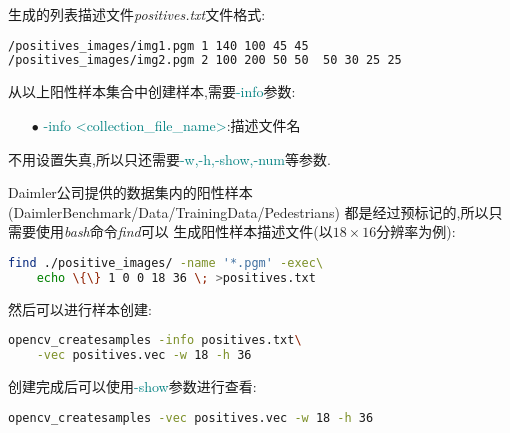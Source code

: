 \documentclass[10pt,technote]{IEEEtran}
\begin{document}
生成的列表描述文件\textit{positives.txt}文件格式:
\begin{lstlisting}[language=bash]
/positives_images/img1.pgm 1 140 100 45 45
/positives_images/img2.pgm 2 100 200 50 50  50 30 25 25
\end{lstlisting}
从以上阳性样本集合中创建样本,需要\textcolor{teal}{-info}参数:
\begin{enumerate}
\item[$\bullet$]\textcolor{teal}{-info <collection\_file\_name>}:描述文件名
\end{enumerate}
不用设置失真,所以只还需要\textcolor{teal}{-w,-h,-show,-num}等参数.

Daimler公司提供的数据集内的阳性样本
(\textsf{DaimlerBenchmark/Data/TrainingData/Pedestrians})
都是经过预标记的,所以只需要使用\textit{bash}命令\textit{find}可以
生成阳性样本描述文件(以$18\times16$分辨率为例):
\begin{lstlisting}[language=bash]
find ./positive_images/ -name '*.pgm' -exec\ 
	echo \{\} 1 0 0 18 36 \; >positives.txt
\end{lstlisting}
然后可以进行样本创建:
\begin{lstlisting}[language=bash]
opencv_createsamples -info positives.txt\
	-vec positives.vec -w 18 -h 36
\end{lstlisting}
创建完成后可以使用\textcolor{teal}{-show}参数进行查看:
\begin{lstlisting}[language=bash]
opencv_createsamples -vec positives.vec -w 18 -h 36
\end{lstlisting}
\end{document}
